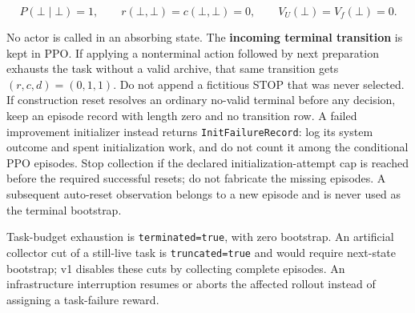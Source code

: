 \documentclass[10pt,a4paper]{article}
\begin{document}
\[
P(\bot\mid\bot)=1,\qquad r(\bot,\bot)=c(\bot,\bot)=0,
\qquad V_U(\bot)=V_f(\bot)=0.
\tag{3j}
\]

No actor is called in an absorbing state. The \textbf{incoming terminal
transition} is kept in PPO. If applying a nonterminal action followed by
next preparation exhausts the task without a valid archive, that same
transition gets \((r,c,d)=(0,1,1)\). Do not append a fictitious STOP
that was never selected. If construction reset resolves an ordinary
no-valid terminal before any decision, keep an episode record with
length zero and no transition row. A failed improvement initializer
instead returns \texttt{InitFailureRecord}: log its system outcome and
spent initialization work, and do not count it among the conditional PPO
episodes. Stop collection if the declared initialization-attempt cap is
reached before the required successful resets; do not fabricate the
missing episodes. A subsequent auto-reset observation belongs to a new
episode and is never used as the terminal bootstrap.

Task-budget exhaustion is \texttt{terminated=true}, with zero bootstrap.
An artificial collector cut of a still-live task is
\texttt{truncated=true} and would require next-state bootstrap; v1
disables these cuts by collecting complete episodes. An infrastructure
interruption resumes or aborts the affected rollout instead of assigning
a task-failure reward.

\begingroup\small
\end{document}
